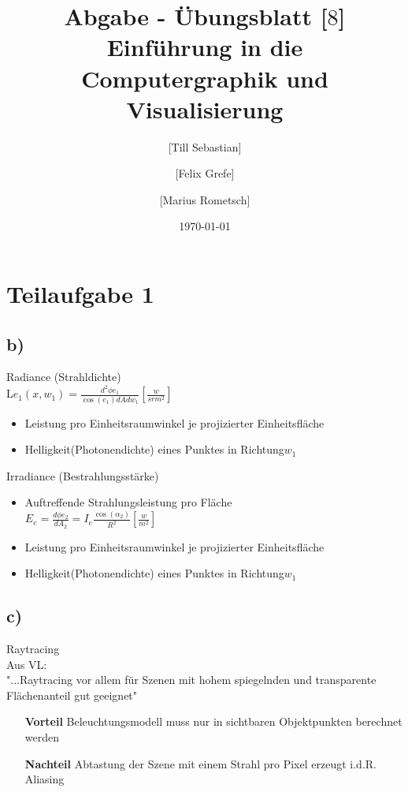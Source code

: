 \documentclass[10pt,a4paper]{article}
\begin{document}
\title{Abgabe - Übungsblatt [$8$]\\
\small{Einführung in die Computergraphik und Visualisierung}}
\author{ [Till Sebastian] \and [Felix Grefe] \and [Marius Rometsch]}
\date{\today}
\maketitle



\section*{Teilaufgabe 1}
\subsection*{b)}
Radiance (Strahldichte)
\\L$e_1(x,w_1)=\frac{d^2\phi e_1}{\cos(e_1)dAdw_1}[\frac{w}{srm^2}]$
\begin{itemize}
\item Leistung pro Einheitsraumwinkel je projizierter Einheitsfläche
\item Helligkeit(Photonendichte) eines Punktes in Richtung$w_1$
\end{itemize}
Irradiance (Bestrahlungsstärke)
\begin{itemize}
	\item Auftreffende Strahlungsleistung pro Fläche
	\\$E_e=\frac{d\phi e_2}{dA_2}=I_e\frac{\cos(\alpha_2)}{R^2}[\frac{w}{m^2}]$
\end{itemize}
\begin{itemize}
	\item Leistung pro Einheitsraumwinkel je projizierter Einheitsfläche
	\item Helligkeit(Photonendichte) eines Punktes in Richtung$w_1$
\end{itemize}
\subsection*{c)}
Raytracing
\\Aus VL:
\\ "...Raytracing vor allem für Szenen mit hohem spiegelnden und transparente Flächenanteil gut geeignet"

\begin{itemize}
\item[\textbf{Vorteil}] Beleuchtungsmodell muss nur in sichtbaren Objektpunkten berechnet werden
\item[\textbf{Nachteil}] Abtastung der Szene mit einem Strahl pro Pixel erzeugt i.d.R. Aliasing
\end{itemize}
\end{document}
